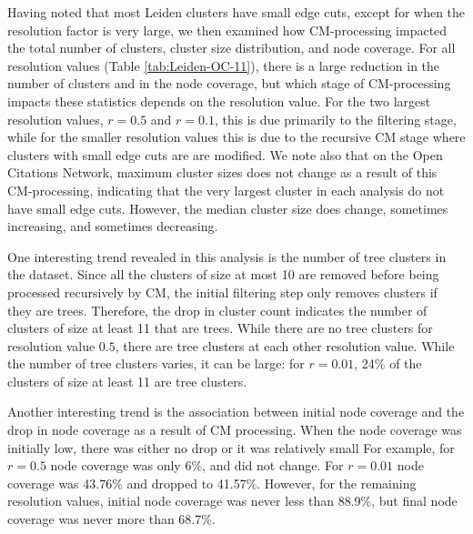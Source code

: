 \documentclass[11pt]{article}   	%
\begin{document}
Having noted that most Leiden clusters have small edge cuts, except for when the resolution factor is very large, we then examined how CM-processing impacted the total number of clusters, cluster size distribution, and node coverage.
For all resolution values (Table \ref{tab:Leiden-OC-11}), there is a large reduction in the number of clusters and in the node coverage, but which stage of CM-processing impacts these statistics depends on the resolution value.
For the  two largest resolution values, $r=0.5$ and $r=0.1$, this is
due primarily  to the filtering stage, while  for the smaller resolution values this is due to the recursive CM stage where clusters with small edge cuts are are modified.
We note also that on the Open Citations Network,  maximum cluster sizes does not change as a result of this CM-processing, indicating that the very largest cluster in each analysis  do not have small edge cuts.  However, the median cluster size does change, sometimes increasing,  and sometimes decreasing. 

One interesting trend revealed in this analysis is the number of tree clusters in the dataset.
Since all the clusters of size at most 10 are removed before being processed recursively by CM, the initial filtering step only removes clusters if they are trees.
Therefore, the drop in cluster count indicates the number of clusters of size at least 11 that are trees.
While there are no tree clusters for resolution value $0.5$,  there are tree clusters at each other resolution value.
While the number of tree clusters varies, it can be large:  for $r=0.01$, 24\% of the clusters of size at least 11 are tree clusters.

Another interesting trend is the association between initial node coverage and the drop in node coverage as a result of CM processing. When the node coverage was initially low, there was either no drop or it was relatively small For example, for $r=0.5$ node coverage was only 6\%, and did not change. For $r=0.01$ node coverage was 43.76\% and dropped to 41.57\%. However, for the remaining resolution values, initial node coverage was never less than 88.9\%, but final node coverage was never more than 68.7\%.
\end{document}
